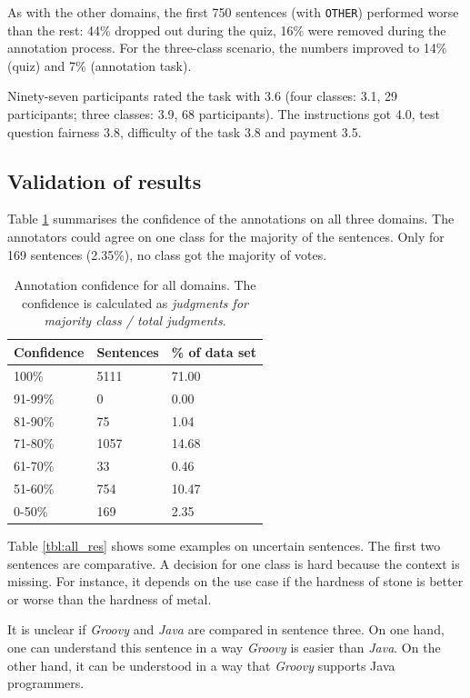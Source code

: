 As with the other domains, the first 750 sentences (with \texttt{OTHER}) performed worse than the rest: 44\% dropped out during the quiz, 16\% were removed during the annotation process. For the three-class scenario, the numbers improved to 14\% (quiz) and 7\% (annotation task).

Ninety-seven participants rated the task with 3.6 (four classes: 3.1, 29 participants; three classes: 3.9, 68 participants). The instructions got 4.0, test question fairness 3.8, difficulty of the task 3.8 and payment 3.5.


\subsection{Validation of results}
Table \ref{fig:all_agg} summarises the confidence of the annotations on all three domains. The annotators could agree on one class for the majority of the sentences. Only for 169 sentences (2.35\%), no class got the majority of votes. 

\begin{table}[hp]
\caption{Annotation confidence for all domains. The confidence is calculated as \emph{judgments for majority class / total judgments}.}
\label{fig:all_agg}
\begin{tabularx}{\textwidth}{XXX}
\toprule
Confidence & Sentences & \% of data set \\
\midrule
100\%	&	5111	&	71.00	 \\ 
91-99\%	&	0	&	0.00	 \\ 
81-90\%	&	75	&	1.04	 \\ 
71-80\%	&	1057	&	14.68	 \\ 
61-70\%	&	33	&	0.46	 \\ 
51-60\%	&	754	&	10.47	 \\ 
0-50\%	&	169	&	2.35	 \\ 
\bottomrule
\end{tabularx}
\end{table}

Table \ref{tbl:all_res} shows some examples on uncertain sentences. The first two sentences are comparative. A decision for one class is hard because the context is missing. For instance, it depends on the use case if the hardness of stone is better or worse than the hardness of metal.

It is unclear if \emph{Groovy} and \emph{Java} are compared in sentence three. On one hand, one can understand this sentence in a way \emph{Groovy} is easier than \emph{Java}. On the other hand, it can be understood in a way that \emph{Groovy} supports Java programmers.

